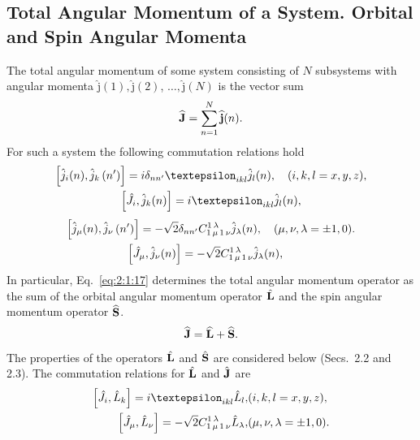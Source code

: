 \subsection{Total Angular Momentum of a System. Orbital and Spin Angular Momenta}\label{sec:2.1.4}
The total angular momentum of some system consisting of $N$ subsystems with angular momenta $\widehat{\mathrm{j}}(1), \widehat{\mathrm{j}}(2)$, $\ldots, \widehat{\mathrm{j}}(N)$ is the vector sum
\begin{equation}
\widehat{\mathbf{J}}=\sum_{n=1}^{N} \widehat{\mathbf{j}}(n). \label{eq:2:1:17}
\end{equation}
For such a system the following commutation relations hold
\begin{gather}
{\left[\hat{j}_{i}(n), \hat{j}_{k}\left(n^{\prime}\right)\right]=i \delta_{n n^{\prime}} \varepsilon_{i k l} \hat{j}_{l}(n), \quad(i, k, l=x, y, z)},  \label{eq:2:1:18}\\
{\left[\hat{J}_{i}, \hat{j}_{k}(n)\right]=i \varepsilon_{i k l} \hat{j}_{l}(n),}  \notag
\end{gather}
\begin{gather}
{\left[\hat{j}_{\mu}(n), \hat{j}_{\nu}\left(n^{\prime}\right)\right]=-\sqrt{2} \delta_{n n^{\prime}} C_{1\,\mu\,1\,\nu}^{1\,\lambda} \hat{j}_{\lambda}(n), \quad(\mu, \nu, \lambda= \pm 1,0) .}  \label{eq:2:1:19} \\
{\left[\hat{J}_{\mu}, \hat{j}_{\nu}(n)\right]=-\sqrt{2} C_{1\,\mu\,1\,\nu}^{1\,\lambda} \hat{j}_{\lambda}(n), \quad} \notag
\end{gather}
In particular, Eq.~\eqref{eq:2:1:17} determines the total angular momentum operator as the sum of the orbital angular momentum operator $\hat{\mathbf{L}}$ and the spin angular momentum operator $\widehat{\mathbf{S}}$.
\begin{equation}
\widehat{\mathbf{J}}=\widehat{\mathbf{L}}+\widehat{\mathbf{S}}. \label{eq:2:1:20}
\end{equation}
The properties of the operators $\hat{\mathbf{L}}$ and $\hat{\mathbf{S}}$ are considered below (Secs.~2.2 and 2.3). The commutation relations for $\hat{\mathbf{L}}$ and $\hat{\mathbf{J}}$ are
\begin{equation}
\begin{aligned}
{\left[\hat{J}_{i}, \hat{L}_{k}\right]=i \varepsilon_{i k l} \hat{L}_{l},} & (i, k, l=x, y, z),\\
{\left[\hat{J}_{\mu}, \hat{L}_{\nu}\right]=-\sqrt{2} \clebsch{1}{\mu}{1}{\nu}{1}{\lambda} \hat{L}_{\lambda},} & (\mu, \nu, \lambda= \pm 1,0). \label{eq:2:1:21}
\end{aligned}
\end{equation}
